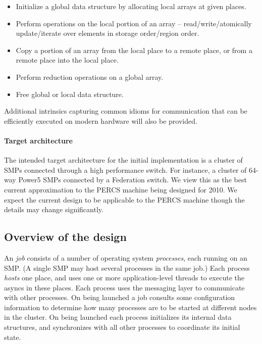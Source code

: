 \begin{itemize}
\item Initialize a global data structure by allocating local arrays at
  given places.

{}\item Perform operations on the local portion of an array --
read/write/atomically update/iterate over elements in storage
order/region order.

{}\item Copy a portion of an array from the local place to a remote
place, or from a remote place into the local place.

{}\item Perform reduction operations on a global array.

\item Free global or local data structure.
\end{itemize}

Additional intrinsics capturing common idioms for communication that
can be efficiently executed on modern hardware will also be provided.

\paragraph{Target architecture}
The intended target architecture for the initial \Xtenlib{}
implementation is a cluster of SMPs connected through a high
performance switch. For instance, a cluster of 64-way Power5 SMPs
connected by a Federation switch. We view this as the best current
approximation to the PERCS machine being designed for 2010. We expect
the current design to be applicable to the PERCS machine though the
details may change significantly.

%
%
%

\subsection{Overview of the design}
An \Xten{} {\em job} consists of a number of \Xten{} operating system
{\em processes}, each running on an SMP. (A single SMP may host
several processes in the same job.) Each process {\em hosts} one
place, and uses one or more application-level threads to execute
the asyncs in these places. Each process uses the messaging layer to
communicate with other processes. On being launched a job consults
some configuration information to determine how many processes are to
be started at different nodes in the cluster.  On being launched each
process initializes its internal data structures, and synchronizes
with all other processes to coordinate its initial state.

